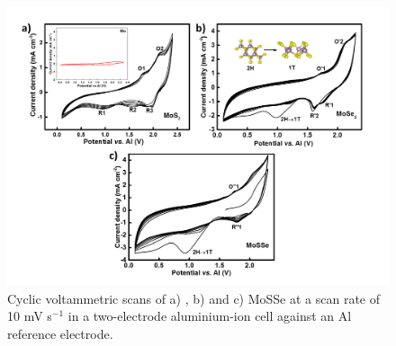 \begin{figure}[htb!]
\centering
\includegraphics[width=\textwidth]{Figures/chap4fig/CV}
\caption{Cyclic voltammetric scans of a) , b)  and c) MoSSe at a scan rate of 10 mV s$^{-1}$ in a two-electrode aluminium-ion cell against an Al reference electrode.}
\label{Figures/chap4fig:CV}
\end{figure} 

